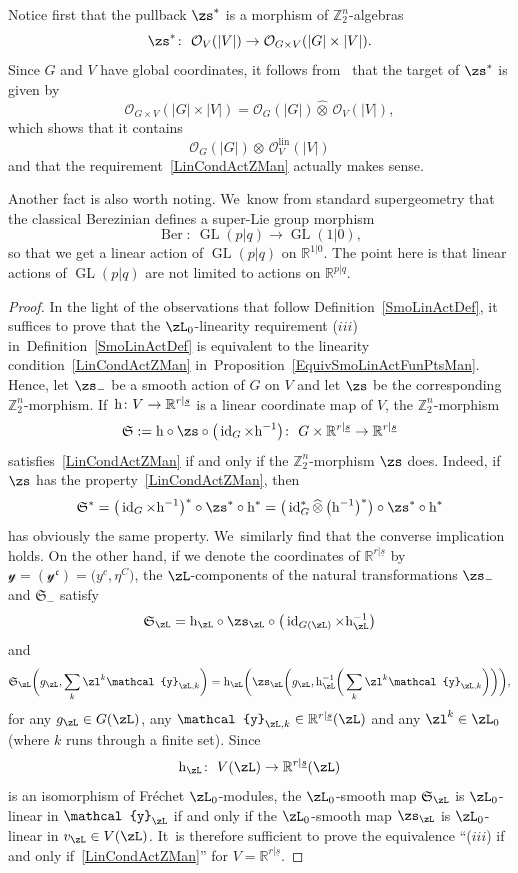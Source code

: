 \documentclass[10pt,a4paper]{amsart}
\newcommand{\rmh}{\textnormal{h}}
\newcommand{\op}[1]{\operatorname{#1}}
\newcommand{\R}{{\mathbb R}}
\newcommand{\Z}{{\mathbb Z}}
\def\ul{\underline}
\def\cO{\mathcal{O}}
\def\ul{\underline}
\newcommand{\0}{\otimes}
\newcommand{\id}{\op{id}}
\newcommand{\z}{\Z_2^n}
\numberwithin{equation}{section}
\begin{document}
Notice first that the pullback $\zs^*$ is a morphism of $\z$-algebras
\[
\zs^*\colon\ \cO_V(|V|)\to\cO_{G\times V}(|G|\times|V|).
\]
Since $G$ and $V$ have global coordinates, it follows from~\cite{Bruce:2019} that the target of $\zs^*$ is given by
\[
\cO_{G\times V}(|G|\times|V|)=\cO_G(|G|)\widehat{\otimes}\,\cO_V(|V|),
\]
which shows that it contains
\[
\cO_G(|G|)\0\,\cO_V^{\op{lin}}(|V|)
\]
and that the requirement~\eqref{LinCondActZMan} actually makes sense.

Another fact is also worth noting. We~know from standard supergeometry that the classical Berezinian defines a super-Lie group morphism
\[
\op{Ber}\colon\ \op{GL}(p|q)\to\op{GL}(1|0),
\]
so that we get a linear action of $\op{GL}(p|q)$ on $\R^{1|0}$. The point here is that linear actions of $\op{GL}(p|q)$ are not limited to actions on $\R^{p|q}$.
\begin{proof}
In the light of the observations that follow Definition~\ref{SmoLinActDef}, it suffices to prove that the $\zL_0$-linearity requirement ($iii$) in~Definition~\ref{SmoLinActDef} is equivalent to the linearity condition~\eqref{LinCondActZMan} in~Proposition~\ref{EquivSmoLinActFunPtsMan}. Hence, let $\zs_-$ be a smooth action of $G$ on $V$ and let $\zs$ be the corresponding $\z$-morphism. If~$\rmh\colon V\to\R^{r|\ul s}$ is a linear coordinate map of $V$, the $\z$-morphism
\[
\mathfrak{S}:=\rmh\circ\zs\circ\big(\id_G\times\rmh^{-1}\big)\colon\ G\times\R^{r|\ul s}\to \R^{r|\ul s}
\]
satisfies~\eqref{LinCondActZMan} if and only if the $\z$-morphism $\zs$ does. Indeed, if $\zs$ has the property~\eqref{LinCondActZMan}, then
\[
\mathfrak{S}^*=\big(\id_G\times\rmh^{-1}\big)^*\circ\zs^*\circ\rmh^* =\big(\id_G^*\widehat{\0}\,\big(\rmh^{-1}\big)^*\big)\circ\zs^*\circ\rmh^*
\]
has obviously the same property. We~similarly find that the converse implication holds. On the other hand, if we denote the coordinates of $\R^{r|\ul s}$ by $\mathcal{y}=(\mathcal{y}^{\mathfrak{c}})=\big(y^c,\eta^C\big)$, the $\zL$-components of the natural transformations $\zs_-$ and $\mathfrak{S}_-$ satisfy
\[
\mathfrak{S}_\zL=\rmh_\zL\circ\zs_\zL\circ\big(\id_{G(\zL)}\times\rmh_\zL^{-1}\big)
\]
and
\[
\mathfrak{S}_\zL\bigg(g_\zL,\sum_k\zl^k\mathcal{y}_{\zL,k}\bigg) =\rmh_\zL\bigg(\zs_\zL\bigg(g_\zL,\rmh_\zL^{-1}\bigg(\sum_k\zl^k\mathcal{y}_{\zL,k}\bigg)\bigg)\bigg),
\]
for any $g_\zL\in G(\zL)$, any $\mathcal{y}_{\zL,k}\in\R^{r|\ul s}(\zL)$ and any $\zl^k\in\zL_0$ (where $k$ runs through a finite set). Since
\[
\rmh_\zL\colon\ V(\zL)\to\R^{r|\ul s}(\zL)
\]
is an isomorphism of Fr\'echet $\zL_0$-modules, the $\zL_0$-smooth map $\mathfrak{S}_\zL$ is $\zL_0$-linear in $\mathcal{y}_\zL$ if and only if the $\zL_0$-smooth map $\zs_\zL$ is $\zL_0$-linear in $v_\zL\in V(\zL)$. It~is therefore sufficient to prove the equivalence ``($iii$) if and only if~\eqref{LinCondActZMan}'' for $V=\R^{r|\ul s}$.


\end{proof}
\end{document}
